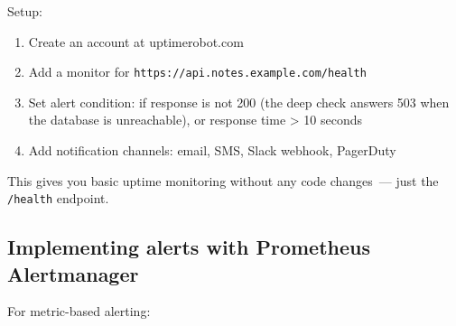 Setup:

\begin{enumerate}
\def\labelenumi{\arabic{enumi}.}
\tightlist
\item
  Create an account at uptimerobot.com
\item
  Add a monitor for \texttt{https:}\allowbreak{}\texttt{/}\allowbreak{}\texttt{/}\allowbreak{}\texttt{api.}\allowbreak{}\texttt{notes.}\allowbreak{}\texttt{example.}\allowbreak{}\texttt{com/}\allowbreak{}\texttt{health}
\item
  Set alert condition: if response is not 200 (the deep check answers 503 when the database is unreachable), or response time \textgreater{} 10 seconds
\item
  Add notification channels: email, SMS, Slack webhook, PagerDuty
\end{enumerate}

\noindent{}This gives you basic uptime monitoring without any code changes~--- just the \texttt{/health} endpoint.

\subsection*{Implementing alerts with Prometheus Alertmanager}\label{35-observability:implementing-alerts-with-prometheus-alertmanager}

For metric-based alerting:


